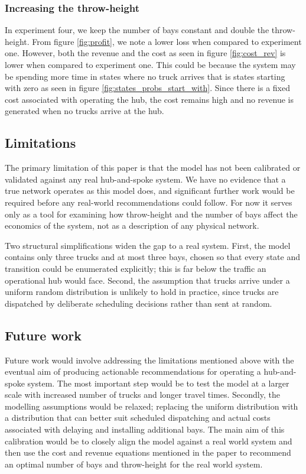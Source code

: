 \documentclass{article}
\theoremstyle{definition}
\theoremstyle{remark}
\numberwithin{equation}{section}
\begin{document}
\subsubsection{Increasing the throw-height}

In experiment four, we keep the number of bays constant and double the throw-height. From figure \ref{fig:profit}, we note a lower loss when compared to experiment one. However, both the revenue and the cost as seen in figure \ref{fig:cost_rev} is lower when compared to experiment one. This could be because the system may be spending more time in states where no truck arrives that is states starting with zero as seen in figure \ref{fig:states_probs_start_with}. Since there is a fixed cost associated with operating the hub, the cost remains high and no revenue is generated when no trucks arrive at the hub.


\subsection{Limitations}
The primary limitation of this paper is that the model has not been calibrated or validated against any real hub-and-spoke system. We have no evidence that a true network operates as this model does, and significant further work would be required before any real-world recommendations could follow. For now it serves only as a tool for examining how throw-height and the number of bays affect the economics of the system, not as a description of any physical network.

Two structural simplifications widen the gap to a real system. First, the model contains only three trucks and at most three bays, chosen so that every state and transition could be enumerated explicitly; this is far below the traffic an operational hub would face. Second, the assumption that trucks arrive under a uniform random distribution is unlikely to hold in practice, since trucks are dispatched by deliberate scheduling decisions rather than sent at random.

\subsection{Future work}
Future work would involve addressing the limitations mentioned above with the eventual aim of producing actionable recommendations for operating a hub-and-spoke system. The most important step would be to test the model at a larger scale with increased number of trucks and longer travel times. Secondly, the modelling assumptions would be relaxed; replacing the uniform distribution with a distribution that can better suit scheduled dispatching and actual costs associated with delaying and installing additional bays. The main aim of this calibration would be to closely align the model against a real world system and then use the cost and revenue equations mentioned in the paper to recommend an optimal number of bays and throw-height for the real world system.
\end{document}
